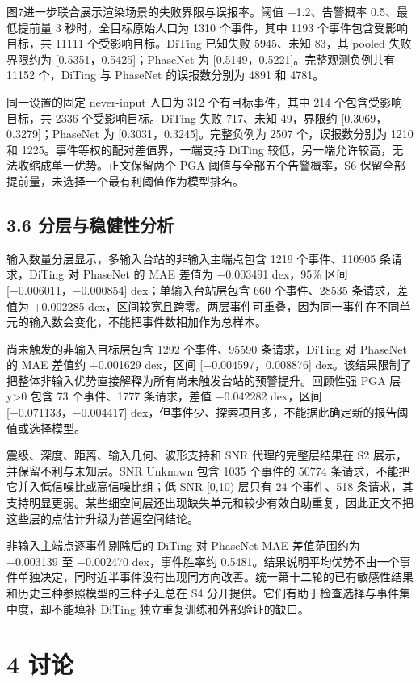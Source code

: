 \documentclass[UTF8,a4paper,11pt]{ctexart}
\begin{document}
图7进一步联合展示渲染场景的失败界限与误报率。阈值 −1.2、告警概率 0.5、最低提前量 3 秒时，全目标原始人口为 1310 个事件，其中 1193 个事件包含受影响目标，共 11111 个受影响目标。DiTing 已知失败 5945、未知 83，其 pooled 失败界限约为 [0.5351，0.5425]；PhaseNet 为 [0.5149，0.5221]。完整观测负例共有 11152 个，DiTing 与 PhaseNet 的误报数分别为 4891 和 4781。

同一设置的固定 never-input 人口为 312 个有目标事件，其中 214 个包含受影响目标，共 2336 个受影响目标。DiTing 失败 717、未知 49，界限约 [0.3069，0.3279]；PhaseNet 为 [0.3031，0.3245]。完整负例为 2507 个，误报数分别为 1210 和 1225。事件等权的配对差值界，一端支持 DiTing 较低，另一端允许较高，无法收缩成单一优势。正文保留两个 PGA 阈值与全部五个告警概率，S6 保留全部提前量，未选择一个最有利阈值作为模型排名。

\subsection*{3.6 分层与稳健性分析}

输入数量分层显示，多输入台站的非输入主端点包含 1219 个事件、110905 条请求，DiTing 对 PhaseNet 的 MAE 差值为 −0.003491 dex，95\% 区间 [−0.006011，−0.000854] dex；单输入台站层包含 660 个事件、28535 条请求，差值为 +0.002285 dex，区间较宽且跨零。两层事件可重叠，因为同一事件在不同单元的输入数会变化，不能把事件数相加作为总样本。

尚未触发的非输入目标层包含 1292 个事件、95590 条请求，DiTing 对 PhaseNet 的 MAE 差值约 +0.001629 dex，区间 [−0.004597，0.008876] dex。该结果限制了把整体非输入优势直接解释为所有尚未触发台站的预警提升。回顾性强 PGA 层 y>0 包含 73 个事件、1777 条请求，差值 −0.042282 dex，区间 [−0.071133，−0.004417] dex，但事件少、探索项目多，不能据此确定新的报告阈值或选择模型。

震级、深度、距离、输入几何、波形支持和 SNR 代理的完整层结果在 S2 展示，并保留不利与未知层。SNR Unknown 包含 1035 个事件的 50774 条请求，不能把它并入低信噪比或高信噪比组；低 SNR [0,10) 层只有 24 个事件、518 条请求，其支持明显更弱。某些细空间层还出现缺失单元和较少有效自助重复，因此正文不把这些层的点估计升级为普遍空间结论。

非输入主端点逐事件剔除后的 DiTing 对 PhaseNet MAE 差值范围约为 −0.003139 至 −0.002470 dex，事件胜率约 0.5481。结果说明平均优势不由一个事件单独决定，同时近半事件没有出现同方向改善。统一第十二轮的已有敏感性结果和历史三种参照模型的三种子汇总在 S4 分开提供。它们有助于检查选择与事件集中度，却不能填补 DiTing 独立重复训练和外部验证的缺口。

\section*{4 讨论}
\end{document}
